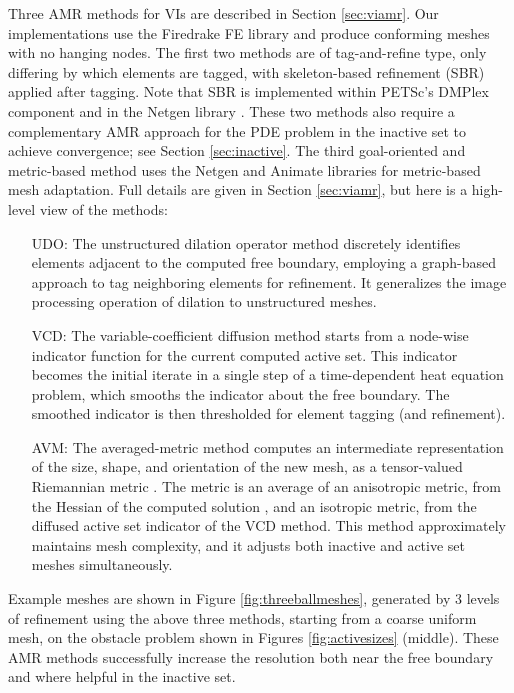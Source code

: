 \documentclass[]{interact}
\theoremstyle{plain}%
\theoremstyle{definition}
\theoremstyle{remark}
\begin{document}
Three AMR methods for VIs are described in Section \ref{sec:viamr}.  Our implementations use the Firedrake FE library \cite{Rathgeberetal2016} and produce conforming meshes with no hanging nodes.  The first two methods are of tag-and-refine type, only differing by which elements are tagged, with skeleton-based refinement (SBR) \cite{PlazaCarey2000} applied after tagging.  Note that SBR is implemented within PETSc's DMPlex component \cite{petsc-user-ref} and in the Netgen library \cite{Betteridgeetal2024}.  These two methods also require a complementary AMR approach for the PDE problem in the inactive set to achieve convergence; see Section \ref{sec:inactive}.  The third goal-oriented and metric-based method uses the Netgen and Animate \cite{Wallworketal2020} libraries for metric-based mesh adaptation.  Full details are given in Section \ref{sec:viamr}, but here is a high-level view of the methods:

\begin{itemize}
\item[UDO:] The unstructured dilation operator method discretely identifies elements adjacent to the computed free boundary, employing a graph-based approach to tag neighboring elements for refinement.  It generalizes the image processing operation of dilation \cite{Pratt1991} to unstructured meshes.
\item[VCD:] The variable-coefficient diffusion method starts from a node-wise indicator function for the current computed active set.  This indicator becomes the initial iterate in a single step of a time-dependent heat equation problem, which smooths the indicator about the free boundary.  The smoothed indicator is then thresholded for element tagging (and refinement).
\item[AVM:] The averaged-metric method computes an intermediate representation of the size, shape, and orientation of the new mesh, as a tensor-valued Riemannian metric \cite{Alauzet2010}.  The metric is an average of an anisotropic metric, from the Hessian of the computed solution \cite{Wallworketal2020}, and an isotropic metric, from the diffused active set indicator of the VCD method.  This method approximately maintains mesh complexity, and it adjusts both inactive and active set meshes simultaneously.
\end{itemize}

Example meshes are shown in Figure \ref{fig:threeballmeshes}, generated by 3 levels of refinement using the above three methods, starting from a coarse uniform mesh, on the obstacle problem shown in Figures \ref{fig:activesizes} (middle).  These AMR methods successfully increase the resolution both near the free boundary and where helpful in the inactive set.
\end{document}
